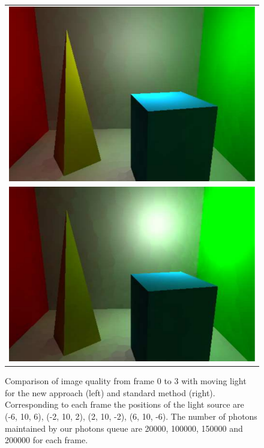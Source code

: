 \begin{figure}
\begin{center}
{\begin{tabular}{c}
\includegraphics*[scale=0.2]{imgs/pq2_ref_frame2.pdf}\\
\includegraphics*[scale=0.2]{imgs/pq2_ref_frame3.pdf}
\end{tabular}
}%
\renewcommand{\thefigure}{\thechapter.\arabic{figure}}
\caption[Comparison of image quality from frame 0 to 3 with moving light]{Comparison of image quality from frame 0 to 3 with moving light for the new approach (left) and standard method (right). Corresponding to each frame the positions of the light source are (-6, 10, 6), (-2, 10, 2), (2, 10, -2), (6, 10, -6). The number of photons maintained by our photons queue are 20000, 100000, 150000 and 200000 for each frame.}
\label{fig:result2_images1}
\end{center}
\end{figure}

